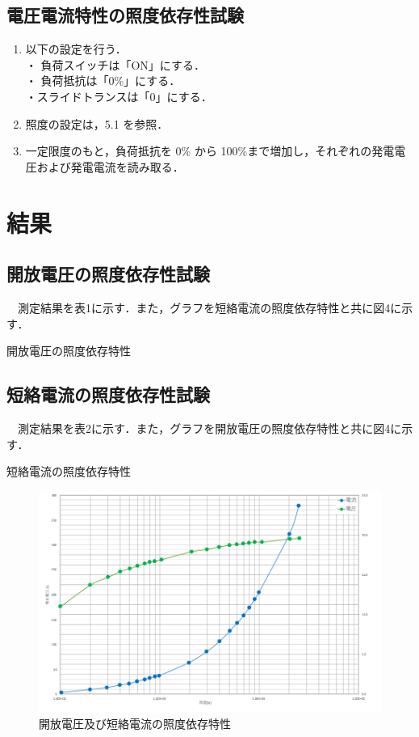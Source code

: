 \subsection{電圧電流特性の照度依存性試験}
\begin{enumerate}
  \item 以下の設定を行う．\\
  ・ 負荷スイッチは「ON」にする．\\
  ・ 負荷抵抗は「0\%」にする．\\
  ・スライドトランスは「0」にする．
  \item 照度の設定は，5.1 を参照．
  \item 一定限度のもと，負荷抵抗を 0\% から 100\%まで増加し，それぞれの発電電圧および発電電流を読み取る．
\end{enumerate}

\newpage
\section{結果}
\subsection{開放電圧の照度依存性試験}
　測定結果を表1に示す．また，グラフを短絡電流の照度依存特性と共に図4に示す．\\

\begin{table}[H]
  \small
  \centering
  \caption{開放電圧の照度依存特性}
  
\end{table}

\newpage
\subsection{短絡電流の照度依存性試験}
　測定結果を表2に示す．また，グラフを開放電圧の照度依存特性と共に図4に示す．\\
\begin{table}[H]
  \small
  \centering
  \small
  \caption{短絡電流の照度依存特性}
  
\end{table}

\begin{figure}[H]
  \centering
  \includegraphics[width=14.3cm]{./fig/fig04.png}
  \caption{開放電圧及び短絡電流の照度依存特性}
\end{figure}

